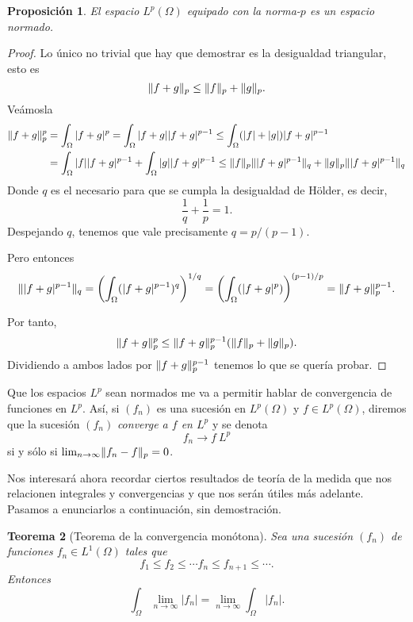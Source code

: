 \documentclass[12pt,a4paper]{book}
\DeclarePairedDelimiter\norm{\lVert}{\rVert}
\newtheorem{thm}{Teorema}[section]
\newtheorem{prop}[thm]{Proposición}
\theoremstyle{definition} \newtheorem{defn}[thm]{Definición}
\theoremstyle{definition} \newtheorem{ejemplo}[thm]{Ejemplo}
\theoremstyle{definition} \newtheorem{ejercicio}[thm]{Ejercicio}
\theoremstyle{remark} \newtheorem*{obs}{Observación}
\begin{document}
\begin{prop}
  El espacio $L^p(\Omega)$ equipado con la norma-$p$ es un espacio normado.
\end{prop}
\begin{proof}
  Lo único no trivial que hay que demostrar es la desigualdad triangular, esto es
  \begin{equation*}
    \norm{f+g}_p \leq \norm{f}_p + \norm{g}_p.
  \end{equation*}
  Veámosla
  \begin{align*}
    \norm{f+g}_p^p &= \int_\Omega |f+g|^p = \int_\Omega |f+g||f+g|^{p-1} \leq \int_\Omega (|f|+|g|) |f+g|^{p-1} \\ & = \int_\Omega |f| |f+g|^{p-1} + \int_\Omega |g| |f+g|^{p-1} \leq \norm{f}_p \norm{|f+g|^{p-1}}_q +\norm{g}_p \norm{|f+g|^{p-1}}_q
  \end{align*}
  Donde $q$ es el necesario para que se cumpla la desigualdad de Hölder, es decir, 
  \begin{equation*}
    \frac{1}{q}+\frac{1}{p}=1.
  \end{equation*}
  Despejando $q$, tenemos que vale precisamente $q=p/(p-1)$.

  Pero entonces
  \begin{equation*}
    \norm{|f+g|^{p-1}}_q=\left( \int_\Omega (|f+g|^{p-1})^q \right)^{1/q}=\left( \int_\Omega (|f+g|^p) \right)^{(p-1)/p}=\norm{f+g}_p^{p-1}.
  \end{equation*}
  
  Por tanto,
  \begin{equation*}
    \norm{f+g}_p^p \leq \norm{f+g}_p^{p-1}(\norm{f}_p + \norm{g}_p).
  \end{equation*}
  Dividiendo a ambos lados por $\norm{f+g}_p^{p-1}$ tenemos lo que se quería probar.
\end{proof}

Que los espacios $L^p$ sean normados me va a permitir hablar de convergencia de funciones en $L^p$. Así, si $(f_n)$ es una sucesión en $L^p(\Omega)$ y $f\in L^p(\Omega)$, diremos que la sucesión $(f_n)$ \emph{converge a $f$ en $L^p$} y se denota
\begin{equation*}
  f_n \rightarrow f \ L^p
\end{equation*}
si y sólo si $\lim_{n\rightarrow \infty} \norm{f_n-f}_p=0$.

Nos interesará ahora recordar ciertos resultados de teoría de la medida que nos relacionen integrales y convergencias y que nos serán útiles más adelante. Pasamos a enunciarlos a continuación, sin demostración.
\begin{thm}[Teorema de la convergencia monótona]
  Sea una sucesión $(f_n)$ de funciones $f_n \in L^1(\Omega)$ tales que
  \begin{equation*}
    f_1 \leq f_2 \leq \cdots f_n \leq f_{n+1} \leq \cdots.
  \end{equation*}
  Entonces 
  \begin{equation*}
    \int_\Omega \lim_{n\rightarrow \infty } |f_n| = \lim_{n\rightarrow \infty} \int_\Omega |f_n|.
  \end{equation*}
\end{thm}
\end{document}
